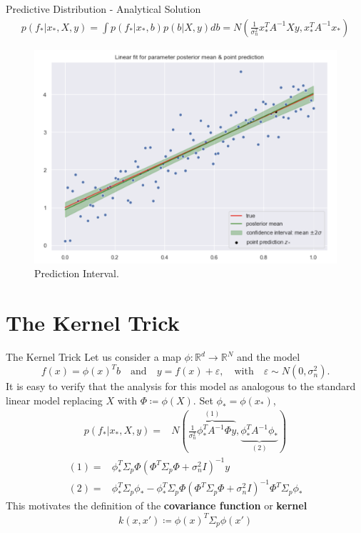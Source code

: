 \documentclass[10pt]{beamer}
\begin{document}
\begin{frame}{Predictive Distribution - Analytical Solution}{\cite[Chapter 2.1.1]{RW05}}
\begin{align*}
p(f_*|x_*, X, y) 
= \int p(f_*|x_*, b)p(b|X, y)db 
= N\left(
\frac{1}{\sigma_n^2}x_*^T A^{-1}Xy, x_*^T A^{-1}x_*
\right)
\end{align*}

\begin{center}
\begin{figure}
\includegraphics[scale=0.25]{images/lin_prediction.png} 
\caption{Prediction Interval.}
\end{figure}
\end{center}
\end{frame}


\section{The Kernel Trick}


\begin{frame}{The Kernel Trick}{\cite[Chapter 2.1.2]{RW05}}
Let us consider a map $\phi: \mathbb{R}^d \longrightarrow \mathbb{R}^N$ and the model
$$
f(x) = \phi(x)^T b \quad \text{and} \quad y = f(x) + \varepsilon, \quad \text{with} \quad \varepsilon \sim N(0, \sigma_n^2). 
$$
It is easy to verify that the analysis for this model as analogous to the standard linear model replacing $X$ with $\Phi\coloneqq \phi(X)$. Set $\phi_*= \phi(x_*)$, 
\begin{align*}
p(f_*|x_*, X, y) =& N\left(
\overbrace{\frac{1}{\sigma_n^2}\phi_*^T A^{-1}\Phi y}^{(1)},
\underbrace{ \phi_*^T A^{-1}\phi_*}_{(2)}
\right)
\end{align*}
\begin{align*}
(1) =& \phi_{*}^T \Sigma_{p}\Phi(\Phi^T \Sigma_p \Phi + \sigma_n^2I)^{-1}y \\
(2)= &\phi_{*}^T\Sigma_p\phi_{*} - \phi_{*}^T \Sigma_{p}\Phi(\Phi^T \Sigma_p \Phi + \sigma_n^2I)^{-1}\Phi^T\Sigma_p\phi_*
\end{align*}
This motivates the definition of the {\bf covariance function} or {\bf kernel}
$$
k(x, x')\coloneqq \phi(x)^T\Sigma_p\phi(x')
$$
\end{frame}
\end{document}

